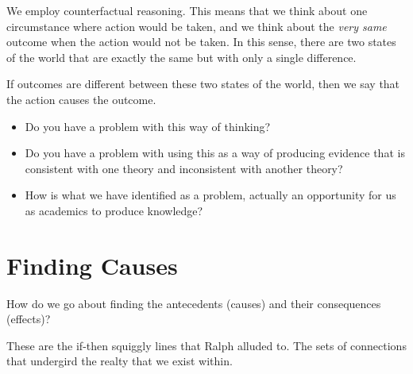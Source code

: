 \documentclass[
  letterpaper,
  DIV=11,
  numbers=noendperiod]{scrreprt}
\begin{document}
We employ counterfactual reasoning. This means that we think about one
circumstance where action would be taken, and we think about the
\emph{very same} outcome when the action would not be taken. In this
sense, there are two states of the world that are exactly the same but
with only a single difference.

If outcomes are different between these two states of the world, then we
say that the action causes the outcome.

\begin{tcolorbox}[enhanced jigsaw, bottomtitle=1mm, coltitle=black, colback=white, colframe=quarto-callout-note-color-frame, title=\textcolor{quarto-callout-note-color}{\faInfo}\hspace{0.5em}{What is the problem with this line of reasoning?}, opacityback=0, arc=.35mm, titlerule=0mm, leftrule=.75mm, toptitle=1mm, rightrule=.15mm, opacitybacktitle=0.6, colbacktitle=quarto-callout-note-color!10!white, toprule=.15mm, left=2mm, bottomrule=.15mm, breakable]

\begin{itemize}
\item
  Do you have a problem with this way of thinking?
\item
  Do you have a problem with using this as a way of producing evidence
  that is consistent with one theory and inconsistent with another
  theory?
\item
  How is what we have identified as a problem, actually an opportunity
  for us as academics to produce knowledge?
\end{itemize}

\end{tcolorbox}

\section{Finding Causes}\label{finding-causes}

How do we go about finding the antecedents (causes) and their
consequences (effects)?

These are the if-then squiggly lines that Ralph alluded to. The sets of
connections that undergird the realty that we exist within.
\end{document}
